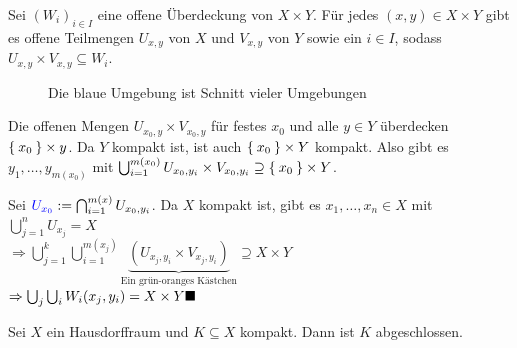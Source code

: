 \begin{beweis}
    Sei $(W_i)_{i \in I}$ eine offene Überdeckung von $X \times Y$.
    Für jedes $(x,y) \in X \times Y$ gibt es offene Teilmengen
    $U_{x,y}$ von $X$ und $V_{x,y}$ von $Y$ sowie ein $i \in I$, sodass
    $U_{x,y} \times V_{x,y} \subseteq W_i$.

    \begin{figure}[htp]
        \centering
        
        \caption{Die blaue Umgebung ist Schnitt vieler Umgebungen}
    \end{figure}

    Die offenen Mengen $U_{x_0, y} \times V_{x_0, y}$ für festes $x_0$
    und alle $y \in Y$ überdecken $\Set{x_0} \times y$. Da $Y$ kompakt
    ist, ist auch $\Set{x_0} \times Y$ kompakt. Also gibt es 
    $y_1, \dots, y_{m(x_0)}$ mit 
    $\bigcup_{i=1}^{m(x_0)} U_{x_0, y_i} \times V_{x_0, y_i} \supseteq \Set{x_0} \times Y$.

    Sei ${\color{blue} U_{x_0}} := \bigcap_{i=1}^{m(x)} U_{x_0, y_i}$.
    Da $X$ kompakt ist, gibt es $x_1, \dots, x_n \in X$ mit 
    $\bigcup_{j=1}^n U_{x_j} = X$\\
    $\Rightarrow \bigcup_{j=1}^k \bigcup_{i=1}^{m(x_j)} \underbrace{\left ( U_{x_j, y_i} \times V_{x_j, y_i} \right)}_{\text{Ein grün-oranges Kästchen}} \supseteq X \times Y$\\
    $\Rightarrow \bigcup_j \bigcup_i W_i (x_j, y_i) = X \times Y \qed$
\end{beweis}

\begin{bemerkung}\label{hausdorffraumKompakteTeilmengeAbgeschlossen}
    Sei $X$ ein Hausdorffraum und $K \subseteq X$ kompakt.
    Dann ist $K$ abgeschlossen.
\end{bemerkung}

